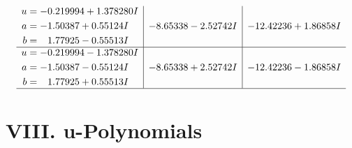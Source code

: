 \documentclass[1p]{elsarticle_modified}
\theoremstyle{definition}
\begin{document}
$$\begin{array}{c|c|c}
\begin{aligned}
u &= -0.219994 + 1.378280 I \\
a &= -1.50387 + 0.55124 I \\
b &= \phantom{-}1.77925 - 0.55513 I\end{aligned}
 & -8.65338 - 2.52742 I & -12.42236 + 1.86858 I \\ \hline\begin{aligned}
u &= -0.219994 - 1.378280 I \\
a &= -1.50387 - 0.55124 I \\
b &= \phantom{-}1.77925 + 0.55513 I\end{aligned}
 & -8.65338 + 2.52742 I & -12.42236 - 1.86858 I\\
 \hline 
 \end{array}$$\newpage
\newpage\renewcommand{\arraystretch}{1}
\centering \section*{ VIII. u-Polynomials}
\end{document}
